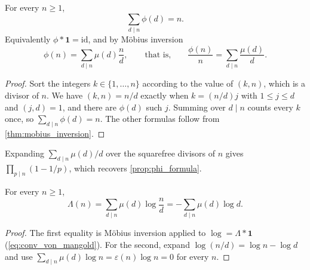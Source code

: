 \begin{proposition}[Gauss]\label{prop:sum_phi_divisors}
    For every $n \ge 1$,
    \begin{equation*}
        \sum_{d \mid n} \phi(d) = n.
    \end{equation*}
    Equivalently $\phi * \mathbf{1} = \mathrm{id}$, and by Möbius inversion
    \begin{equation*}
        \phi(n) = \sum_{d \mid n} \mu(d)\frac{n}{d}, \qquad \text{that is,} \qquad \frac{\phi(n)}{n} = \sum_{d \mid n} \frac{\mu(d)}{d}.
    \end{equation*}
\end{proposition}
\begin{proof}
    Sort the integers $k \in \{1, \dots, n\}$ according to the value of $(k,n)$, which is a divisor of $n$. We have $(k,n) = n/d$ exactly when $k = (n/d)j$ with $1 \le j \le d$ and $(j,d) = 1$, and there are $\phi(d)$ such $j$. Summing over $d \mid n$ counts every $k$ once, so $\sum_{d \mid n}\phi(d) = n$. The other formulas follow from \cref{thm:mobius_inversion}.
\end{proof}
Expanding $\sum_{d \mid n} \mu(d)/d$ over the squarefree divisors of $n$ gives $\prod_{p \mid n}(1 - 1/p)$, which recovers \cref{prop:phi_formula}.

\begin{proposition}\label{prop:lambda_mobius}
    For every $n \ge 1$,
    \begin{equation*}
        \Lambda(n) = \sum_{d \mid n} \mu(d) \log\frac{n}{d} = -\sum_{d \mid n} \mu(d) \log d.
    \end{equation*}
\end{proposition}
\begin{proof}
    The first equality is Möbius inversion applied to $\log = \Lambda * \mathbf{1}$ (\cref{eq:conv_von_mangold}). For the second, expand $\log(n/d) = \log n - \log d$ and use $\sum_{d \mid n}\mu(d)\log n = \varepsilon(n)\log n = 0$ for every $n$.
\end{proof}
